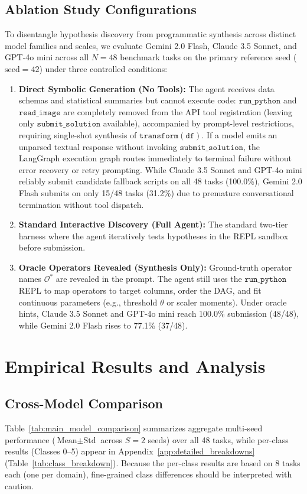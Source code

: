 \documentclass[sigconf]{acmart}
\begin{document}
\subsection{Ablation Study Configurations}
To disentangle hypothesis discovery from programmatic synthesis across distinct model families and scales, we evaluate Gemini 2.0 Flash, Claude 3.5 Sonnet, and GPT-4o mini across all $N=48$ benchmark tasks on the primary reference seed ($\text{seed}=42$) under three controlled conditions:
\begin{enumerate}
    \item \textbf{Direct Symbolic Generation (No Tools):} The agent receives data schemas and statistical summaries but cannot execute code: $\texttt{run\_python}$ and $\texttt{read\_image}$ are completely removed from the API tool registration (leaving only $\texttt{submit\_solution}$ available), accompanied by prompt-level restrictions, requiring single-shot synthesis of $\texttt{transform}(\texttt{df})$. If a model emits an unparsed textual response without invoking $\texttt{submit\_solution}$, the LangGraph execution graph routes immediately to terminal failure without error recovery or retry prompting. While Claude 3.5 Sonnet and GPT-4o mini reliably submit candidate fallback scripts on all 48 tasks (100.0\%), Gemini 2.0 Flash submits on only 15/48 tasks (31.2\%) due to premature conversational termination without tool dispatch.
    \item \textbf{Standard Interactive Discovery (Full Agent):} The standard two-tier harness where the agent iteratively tests hypotheses in the REPL sandbox before submission.
    \item \textbf{Oracle Operators Revealed (Synthesis Only):} Ground-truth operator names $\mathcal{O}^*$ are revealed in the prompt. The agent still uses the $\texttt{run\_python}$ REPL to map operators to target columns, order the DAG, and fit continuous parameters (e.g., threshold $\theta$ or scaler moments). Under oracle hints, Claude 3.5 Sonnet and GPT-4o mini reach 100.0\% submission (48/48), while Gemini 2.0 Flash rises to 77.1\% (37/48).
\end{enumerate}

\section{Empirical Results and Analysis}



\subsection{Cross-Model Comparison}
Table~\ref{tab:main_model_comparison} summarizes aggregate multi-seed performance ($\text{Mean} \pm \text{Std}$ across $S=2$ seeds) over all 48 tasks, while per-class results (Classes 0--5) appear in Appendix~\ref{app:detailed_breakdowns} (Table~\ref{tab:class_breakdown}). Because the per-class results are based on 8 tasks each (one per domain), fine-grained class differences should be interpreted with caution.
\end{document}
